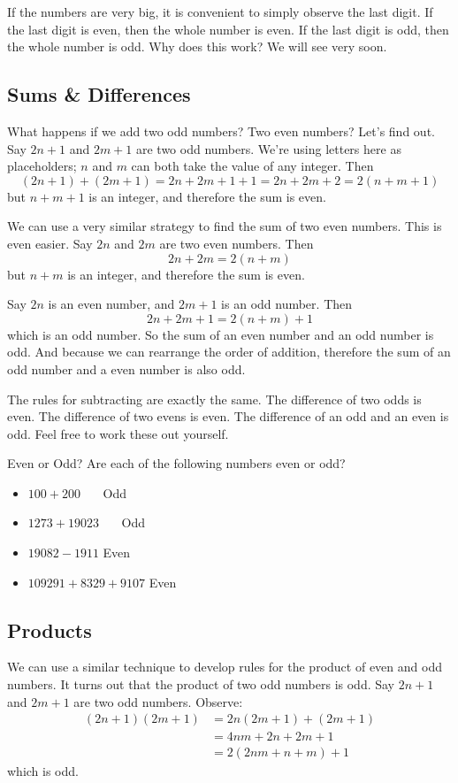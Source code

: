 \documentclass[a4paper,10pt]{report}
\begin{document}
If the numbers are very big, it is convenient to simply observe the last digit.
If the last digit is even, then the whole number is even. If the last digit is
odd, then the whole number is odd. Why does this work? We will see very soon.

\subsection{Sums \& Differences}
What happens if we add two odd numbers? Two even numbers? Let's find out. Say
$2n+1$ and $2m+1$ are two odd numbers. We're using letters here as placeholders;
$n$ and $m$ can both take the value of any integer. Then \[
 (2n+1) + (2m+1) = 2n + 2m + 1 + 1 = 2n + 2m + 2 = 2(n+m+1)
\] but $n+m+1$ is an integer, and therefore the sum is even.

We can use a very similar strategy to find the sum of two even numbers. This is
even easier. Say $2n$ and $2m$ are two even numbers. Then \[
 2n + 2m = 2(n+m)
\] but $n+m$ is an integer, and therefore the sum is even.

Say $2n$ is an even number, and $2m+1$ is an odd number. Then \[
 2n + 2m + 1 = 2(n+m) + 1
\] which is an odd number. So the sum of an even number and an odd number is
odd. And because we can rearrange the order of addition, therefore the sum of an
odd number and a even number is also odd.

The rules for subtracting are exactly the same. The difference of two odds is
even. The difference of two evens is even. The difference of an odd and an even
is odd. Feel free to work these out yourself.

\begin{problem}{Even or Odd?}
 Are each of the following numbers even or odd?

 \begin{itemize}
  \item $100 + 200$ \hfill {}~~~Odd
  \item $1273 + 19023$ \hfill {}~~~Odd
  \item $19082 - 1911$ \hfill Even~~~
  \item $109291 + 8329 + 9107$ \hfill Even~~~
 \end{itemize}
\end{problem}

\subsection{Products}
We can use a similar technique to develop rules for the product of even and odd
numbers. It turns out that the product of two odd numbers is odd. Say $2n+1$
and $2m+1$ are two odd numbers. Observe: \begin{align*}
 (2n+1)(2m+1)
 &= 2n(2m+1) + (2m+1) \\
 &= 4nm+2n+2m+1 \\
 &= 2(2nm+n+m) + 1
\end{align*} which is odd.
\end{document}
